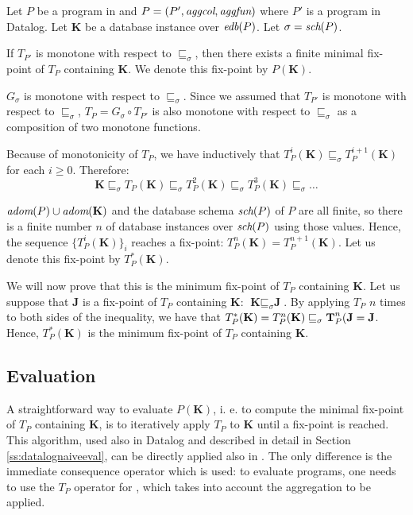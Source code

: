 \begin{thm}
Let $P$ be a program in \datalogra and $P = (P', \textit{aggcol}, \textit{aggfun})$ where $P'$ is a program in Datalog. Let $\textbf{K}$ be a database instance over $\textit{edb}(P)$. Let $\sigma = \textit{sch}(P)$.

If $T_{P'}$ is monotone with respect to $\sqsubseteq_\sigma$, then there exists a finite minimal fix-point of $T_P$ containing $\textbf{K}$. We denote this fix-point by $P(\textbf{K})$.
\end{thm}
\begin{prof}
$G_\sigma$ is monotone with respect to $\sqsubseteq_\sigma$. Since we assumed that $T_{P'}$ is monotone with respect to $\sqsubseteq_\sigma$, $T_P = G_\sigma \circ T_{P'}$ is also monotone with respect to $\sqsubseteq_\sigma$ as a composition of two monotone functions. 

Because of monotonicity of $T_P$, we have inductively that $T_P^i(\textbf{K}) \sqsubseteq_\sigma T_P^{i+1}(\textbf{K})$ for each $i \ge 0$. Therefore:
$$\textbf{K} \sqsubseteq_\sigma T_P(\textbf{K}) \sqsubseteq_\sigma T_P^2(\textbf{K}) \sqsubseteq_\sigma T_P^3(\textbf{K}) \sqsubseteq_\sigma \dots$$

$\textit{adom}(P) \cup \textit{adom}(\textbf{K})$ and the database schema $\textit{sch}(P)$ of $P$ are all finite, so there is a finite number $n$ of database instances over $\textit{sch}(P)$ using those values. Hence, the sequence $\{T_P^i(\textbf{K})\}_i$ reaches a fix-point: $T_P^n(\textbf{K}) = T_P^{n+1}(\textbf{K})$. Let us denote this fix-point by $T_P^*(\textbf{K})$.

We will now prove that this is the minimum fix-point of $T_P$ containing $\textbf{K}$. Let us suppose that $\textbf{J}$ is a fix-point of $T_P$ containing  $\textbf{K}$:  $\textbf{K} \sqsubseteq_\sigma \textbf{J}$. By applying $T_P$ $n$ times to both sides of the inequality, we have that $T_P^*(\textbf{K}) = T_P^n(\textbf{K}) \sqsubseteq_\sigma \textbf T_P^n(\textbf{J} = \textbf{J}$. Hence, $T_P^*(\textbf{K})$ is the minimum fix-point of $T_P$ containing $\textbf{K}$.

\end{prof}


\subsection{Evaluation}
A straightforward way to evaluate $P(\textbf{K})$, i. e. to compute the minimal fix-point of $T_P$ containing $\textbf{K}$, is to iteratively apply $T_P$ to $\textbf{K}$ until a fix-point is reached. This algorithm, used also in Datalog and described in detail in Section \ref{ss:datalognaiveeval}, can be directly applied also in \datalogra. The only difference is the immediate consequence operator which is used: to evaluate \datalogra programs, one needs to use the $T_P$ operator for \datalogra, which takes into account the aggregation to be applied.

